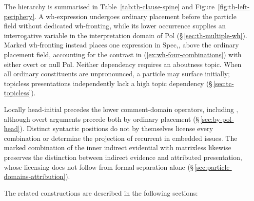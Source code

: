 The hierarchy is summarised in Table~\ref{tab:th-clause-spine} and
Figure~\ref{fig:th-left-periphery}. A wh-expression undergoes ordinary
placement before the particle field without dedicated wh-fronting, while its
lower occurrence supplies an interrogative variable in the interpretation
domain of Pol (§\,\ref{sec:th-multiple-wh}). Marked wh-fronting instead
places one expression in Spec,, above the ordinary placement
field, accounting for the contrast in (\ref{ex:wh-four-combinations}) with
either overt or null Pol. Neither dependency requires an aboutness topic.
When all ordinary constituents are unpronounced, a particle may surface
initially; topicless presentations independently lack a high topic dependency
(§\,\ref{sec:tc-topicless}).

Locally head-initial  precedes the lower comment-domain operators,
including , although overt arguments precede both by ordinary
placement (§\,\ref{sec:by-pol-head}). Distinct syntactic positions do not
by themselves license every combination or determine the projection of
recurrent  in embedded issues. The marked combination of the
inner indirect evidential with matrixless  likewise preserves the
distinction between indirect evidence and attributed presentation, whose
licensing does not follow from formal separation alone
(§\,\ref{sec:particle-domains-attribution}).

The related constructions are described in the following sections:

